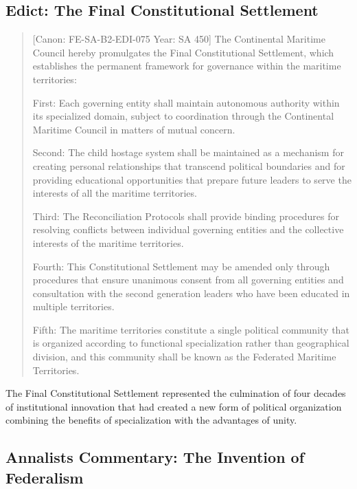 \subsection{Edict: The Final Constitutional
Settlement}\label{edict-the-final-constitutional-settlement}

\begin{quote}
{[}Canon: FE-SA-B2-EDI-075 \textbar{} Year: SA 450{]} The Continental
Maritime Council hereby promulgates the Final Constitutional Settlement,
which establishes the permanent framework for governance within the
maritime territories:

First: Each governing entity shall maintain autonomous authority within
its specialized domain, subject to coordination through the Continental
Maritime Council in matters of mutual concern.

Second: The child hostage system shall be maintained as a mechanism for
creating personal relationships that transcend political boundaries and
for providing educational opportunities that prepare future leaders to
serve the interests of all the maritime territories.

Third: The Reconciliation Protocols shall provide binding procedures for
resolving conflicts between individual governing entities and the
collective interests of the maritime territories.

Fourth: This Constitutional Settlement may be amended only through
procedures that ensure unanimous consent from all governing entities and
consultation with the second generation leaders who have been educated
in multiple territories.

Fifth: The maritime territories constitute a single political community
that is organized according to functional specialization rather than
geographical division, and this community shall be known as the
Federated Maritime Territories.
\end{quote}

The Final Constitutional Settlement represented the culmination of four
decades of institutional innovation that had created a new form of
political organization combining the benefits of specialization with the
advantages of unity.

\subsection{Annalist\textquotesingle s Commentary: The Invention of
Federalism}\label{annalists-commentary-the-invention-of-federalism}

